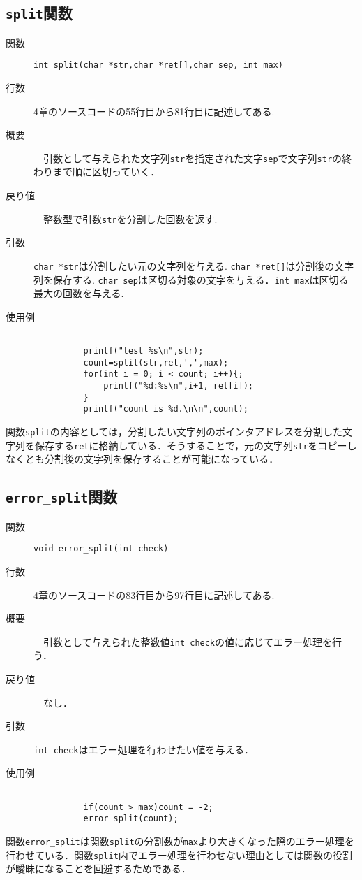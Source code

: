 \documentclass[a4j,11pt]{jarticle}
\begin{document}
\subsection{\texttt{split}関数}
 \begin{description}
    \item[関数] \verb|int split(char *str,char *ret[],char sep, int max)|
    \item[行数]  4章のソースコードの55行目から81行目に記述してある.
    \item[概要]　引数として与えられた文字列\verb|str|を指定された文字\verb|sep|で文字列\verb|str|の終わりまで順に区切っていく．
    \item[戻り値]　整数型で引数\verb|str|を分割した回数を返す.
    \item[引数]  \verb|char *str|は分割したい元の文字列を与える. \verb|char *ret[]|は分割後の文字列を保存する. \verb|char sep|は区切る対象の文字を与える．\verb|int max|は区切る最大の回数を与える. 
    \item[使用例]
      \begin{verbatim}

          printf("test %s\n",str);
          count=split(str,ret,',',max);
          for(int i = 0; i < count; i++){;
              printf("%d:%s\n",i+1, ret[i]);
          }
          printf("count is %d.\n\n",count);
      \end{verbatim}
\end{description}
関数\verb|split|の内容としては，分割したい文字列のポインタアドレスを分割した文字列を保存する\verb|ret|に格納している．そうすることで，元の文字列\verb|str|をコピーしなくとも分割後の文字列を保存することが可能になっている．

\subsection{\texttt{error\_split}関数}
 \begin{description}
    \item[関数] \verb|void error_split(int check)|
    \item[行数]  4章のソースコードの83行目から97行目に記述してある.
    \item[概要]　引数として与えられた整数値\verb|int check|の値に応じてエラー処理を行う．
    \item[戻り値]　なし．
    \item[引数]  \verb|int check|はエラー処理を行わせたい値を与える．
    \item[使用例]
      \begin{verbatim}

          if(count > max)count = -2;
          error_split(count);
      \end{verbatim}
\end{description}
関数\verb|error_split|は関数\verb|split|の分割数が\verb|max|より大きくなった際のエラー処理を行わせている．関数\verb|split|内でエラー処理を行わせない理由としては関数の役割が曖昧になることを回避するためである．
\end{document}
